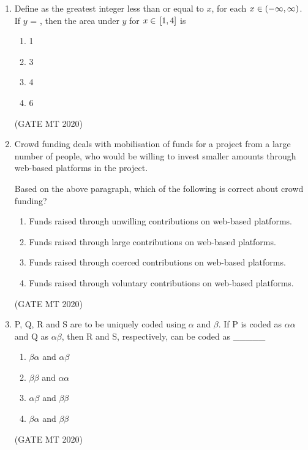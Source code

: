 \documentclass[journal, 11pt, onecolumn]{IEEEtran}
\theoremstyle{remark}
\begin{document}
\begin{enumerate}
\item Define  as the greatest integer less than or equal to $x$, for each $x \in  \left(-\infty, \infty\right)$. If $y$ = , then the area under $y$ for $x \in {}\left[1,4\right]$ is
\begin{multicols}{4}
\begin{enumerate}
    \item 1 
    \item 3
    \item 4
    \item 6
\end{enumerate}
\end{multicols}
\hfill(GATE MT 2020)

\item Crowd funding deals with mobilisation of funds for a project from a large number of people, who would be willing to invest smaller amounts through web-based platforms in the project.  

Based on the above paragraph, which of the following is correct about crowd funding?

\begin{multicols}{2}
\begin{enumerate}
\item Funds raised through unwilling contributions on web-based platforms.  
\item Funds raised through large contributions on web-based platforms.  
\item Funds raised through coerced contributions on web-based platforms.  
\item Funds raised through voluntary contributions on web-based platforms.  
\end{enumerate}
\end{multicols}
\hfill(GATE MT 2020)

\item P, Q, R and S are to be uniquely coded using $\alpha$ and $\beta$. If P is coded as $\alpha\alpha$ and Q as $\alpha\beta$, then R and S, respectively, can be coded as \_\_\_\_\_

\begin{multicols}{2}
\begin{enumerate}
\item $\beta\alpha$ and $\alpha\beta$  
\item $\beta\beta$ and $\alpha\alpha$  
\item $\alpha\beta$ and $\beta\beta$  
\item $\beta\alpha$ and $\beta\beta$  
\end{enumerate}
\end{multicols}
\hfill(GATE MT 2020)


\end{enumerate}
\end{document}
